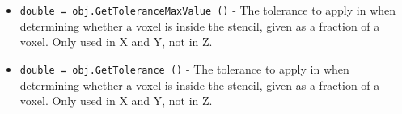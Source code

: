 \begin{itemize}
\item  \verb|double = obj.GetToleranceMaxValue ()| -  The tolerance to apply in when determining whether a voxel
 is inside the stencil, given as a fraction of a voxel.
 Only used in X and Y, not in Z.

\item  \verb|double = obj.GetTolerance ()| -  The tolerance to apply in when determining whether a voxel
 is inside the stencil, given as a fraction of a voxel.
 Only used in X and Y, not in Z.

\end{itemize}

